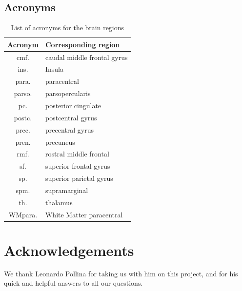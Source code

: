 \documentclass[10pt,conference,compsocconf]{IEEEtran}
\begin{document}
\subsection{Acronyms}
\begin{table}[h!]
    \centering
    \begin{tabular}{| c | l |}
        \hline
        Acronym & Corresponding region \\
        \hline
        cmf. & caudal middle frontal gyrus \\
        ins. & Insula \\
        para. & paracentral \\
        parso. & parsopercularis \\
        pc. & posterior cingulate \\
        postc. & postcentral gyrus \\
        prec. & precentral gyrus \\
	      pren. & precuneus \\
        rmf. & rostral middle frontal \\
        sf. & superior frontal gyrus \\
	      sp. & superior parietal gyrus \\
	      spm. & supramarginal \\
	      th. & thalamus \\
        WMpara. & White Matter paracentral \\
        \hline
    \end{tabular}
    \caption{List of acronyms for the brain regions}
    \label{tab:acronyms}
\end{table}


\section*{Acknowledgements}
We thank Leonardo Pollina for taking us with him on this project, and for his quick and helpful answers to all our questions.



\end{document}
